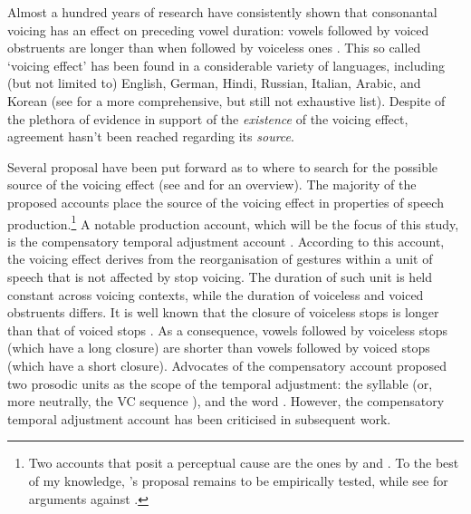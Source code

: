 \documentclass[preprint]{JASAnew}
\begin{document}
Almost a hundred years of research have consistently shown that
consonantal voicing has an effect on preceding vowel duration: vowels
followed by voiced obstruents are longer than when followed by voiceless
ones
\citep{heffner1937, house1953, belasco1953, peterson1960, halle1967, chen1970, klatt1973, lisker1974, raphael1975, javkin1976, maddieson1976, farnetani1986, kluender1988, laeufer1992, fowler1992, hussein1994, esposito2002, lampp2004, warren2005, durvasula2012}.
This so called `voicing effect' has been found in a considerable variety
of languages, including (but not limited to) English, German, Hindi,
Russian, Italian, Arabic, and Korean (see \citealt{maddieson1976} for a
more comprehensive, but still not exhaustive list). Despite of the
plethora of evidence in support of the \emph{existence} of the voicing
effect, agreement hasn't been reached regarding its \emph{source}.

Several proposal have been put forward as to where to search for the
possible source of the voicing effect (see \citealt{soskuthy2013} and
\citealt{begus2017} for an overview). The majority of the proposed
accounts place the source of the voicing effect in properties of speech
production.\footnote{Two accounts that posit a perceptual cause are the ones by \citet{javkin1976} and \citet{kluender1988}. To the best of my knowledge, \citet{javkin1976}'s proposal remains to be empirically tested, while see \citet{fowler1992} for arguments against \citet{kluender1988}.}
A notable production account, which will be the focus of this study, is
the compensatory temporal adjustment account
\citep{lindblom1967, slis1969a, slis1969, lehiste1970, lehiste1970a}.
According to this account, the voicing effect derives from the
reorganisation of gestures within a unit of speech that is not affected
by stop voicing. The duration of such unit is held constant across
voicing contexts, while the duration of voiceless and voiced obstruents
differs. It is well known that the closure of voiceless stops is longer
than that of voiced stops
\citep{lisker1957, van-summers1987, davis1989, de-jong1991}. As a
consequence, vowels followed by voiceless stops (which have a long
closure) are shorter than vowels followed by voiced stops (which have a
short closure). Advocates of the compensatory account proposed two
prosodic units as the scope of the temporal adjustment: the syllable
(or, more neutrally, the VC sequence \citealt{lindblom1967}), and the
word \citep{slis1969a, slis1969, lehiste1970, lehiste1970a}. However,
the compensatory temporal adjustment account has been criticised in
subsequent work.
\end{document}
